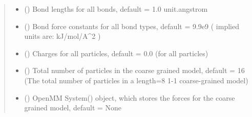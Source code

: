 \documentclass[letterpaper,12pt,english,openany,oneside]{sphinxmanual}
\begin{document}
\begin{fulllineitems}
\begin{quote}
\begin{description}
\begin{itemize}
\item {} 
 (\sphinxstyleliteralemphasis{\sphinxupquote{( }}\sphinxstyleliteralemphasis{\sphinxupquote{,}}\sphinxstyleliteralemphasis{\sphinxupquote{,}}\sphinxstyleliteralemphasis{\sphinxupquote{ )}}) \textendash{} Bond lengths for all bonds, default = 1.0 unit.angstrom

\item {} 
 (\sphinxstyleliteralemphasis{\sphinxupquote{( }}\sphinxstyleliteralemphasis{\sphinxupquote{,}}\sphinxstyleliteralemphasis{\sphinxupquote{, }}\sphinxstyleliteralemphasis{\sphinxupquote{ )}}) \textendash{} Bond force constants for all bond types, default = 9.9e9 ( implied units are: kJ/mol/A\textasciicircum{}2 )

\item {} 
 (\sphinxstyleliteralemphasis{\sphinxupquote{( }}\sphinxstyleliteralemphasis{\sphinxupquote{,}}\sphinxstyleliteralemphasis{\sphinxupquote{ )}}) \textendash{} Charges for all particles, default = 0.0 (for all particles)

\item {} 
 () \textendash{} Total number of particles in the coarse grained model, default = 16 (The total number of particles in a length=8 1-1 coarse-grained model)

\item {} 
 (\sphinxstyleliteralemphasis{\sphinxupquote{(}}\sphinxstyleliteralemphasis{\sphinxupquote{) }}) \textendash{} OpenMM System() object, which stores the forces for the coarse grained model, default = None


\end{itemize}
\end{description}
\end{quote}
\end{fulllineitems}
\end{document}
